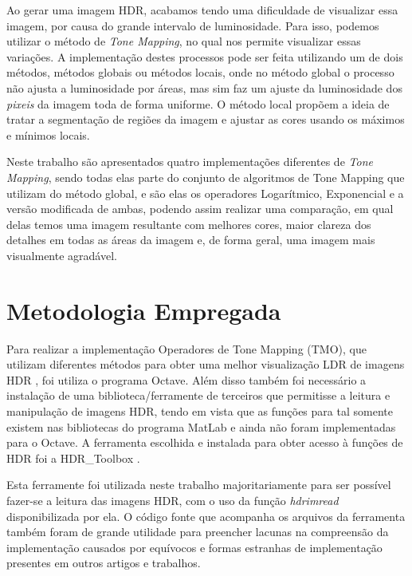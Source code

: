 \documentclass[conference]{IEEEtran}
\begin{document}
Ao gerar uma imagem HDR, acabamos tendo uma dificuldade de visualizar essa imagem, por causa do grande intervalo de luminosidade. Para isso, podemos utilizar o método de \textit{Tone Mapping}, no qual nos permite visualizar essas variações.
A implementação destes processos pode ser feita utilizando um de dois métodos, métodos globais ou métodos locais, onde no método global o processo não ajusta a luminosidade por áreas, mas sim faz um ajuste da luminosidade dos \textit{pixeis} da imagem toda de forma uniforme. O método local propõem a ideia de tratar a segmentação de regiões da imagem e ajustar as cores usando os máximos e mínimos locais.

Neste trabalho são apresentados quatro implementações diferentes de \textit{Tone Mapping}, sendo todas elas parte do conjunto de algoritmos de Tone Mapping que utilizam do método global, e são elas os operadores Logarítmico, Exponencial e a versão modificada de ambas, podendo assim realizar uma comparação, em qual delas temos uma imagem resultante com melhores cores, maior clareza dos detalhes em todas as áreas da imagem e, de forma geral, uma imagem mais visualmente agradável. %

\section{Metodologia Empregada}

Para realizar a implementação Operadores de Tone Mapping (TMO), que utilizam diferentes métodos para obter uma melhor visualização LDR de imagens HDR , foi utiliza o programa Octave. Além disso também foi necessário a instalação de uma biblioteca/ferramente de terceiros que permitisse a leitura e manipulação de imagens HDR, tendo em vista que as funções para tal somente existem nas bibliotecas do programa MatLab e ainda não foram implementadas para o Octave. A ferramenta escolhida e instalada para obter acesso à funções de HDR foi a HDR\_Toolbox \cite{Banterle:2017}.

Esta ferramente foi utilizada neste trabalho majoritariamente para ser possível fazer-se a leitura das imagens HDR, com o uso da função \textit{hdrimread} disponibilizada por ela. O código fonte que acompanha os arquivos da ferramenta também foram de grande utilidade para preencher lacunas na compreensão da implementação causados por equívocos e formas estranhas de implementação presentes em outros artigos e trabalhos.
\end{document}
